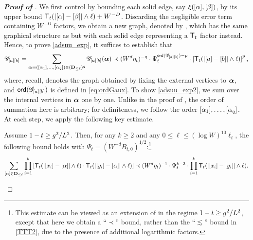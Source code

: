 \begin{proof}[\bf Proof of ]
We first control  by bounding each solid edge, say $\xi([\alpha],[\beta])$, by its upper bound ${\mathsf T}_t(|[\alpha]-[\beta]|\wedge \ell)+W^{-D}$. 
Discarding the negligible error term containing $W^{-D}$ factors, we obtain a new graph, denoted by , which has the same graphical structure as  but with each solid edge representing a ${\mathsf T}_t$ factor instead. Hence, to prove \eqref{adsuu_exp}, it suffices to establish that
\begin{equation}\label{adsuu_exp2}
\mathscr G_{[a][b]} = \sum_{{\boldsymbol{\alpha}}=([\alpha_1],\ldots,[\alpha_q])\in ({\mathbf{D}}_{\le \ell})^q}\mathscr G_{[a][b]}({\boldsymbol{\alpha}}) \prec (W^d\eta_t)^{-q}\cdot \Psi_t^{{\mathsf{ord}}(\mathscr G_{[a][b]})-p}\cdot \left[{{\mathsf T}_{t}(|[a]-[b]|\wedge \ell)}\right]^{p} ,
\end{equation}
where, recall,  denotes the graph obtained by fixing the external vertices to ${\boldsymbol{\alpha}}$, and ${\mathsf{ord}}(\mathscr G_{[a][b]})$ is defined in \eqref{eq:ordGaux}.
To show \eqref{adsuu_exp2}, we sum over the internal vertices in ${\boldsymbol{\alpha}}$ one by one. Unlike in the proof of , the order of summation here is arbitrary; for definiteness, we follow the order $[\alpha_1],\ldots,[\alpha_q]$. At each step, we apply the following key estimate.
\begin{claim}\label{claim:TTk}
Assume $1-t\ge g^2/L^{2}$. Then, for any $k \ge 2$ and any $0\le \ell \le (\log W)^{10}\ell_t$, the following bound holds with $\Psi_t=(W^{-d}B_{t,0})^{1/2}$:\footnote{This estimate can be viewed as an extension of  in the regime $1-t \ge g^2/L^2$, except that here we obtain a ``$\prec$'' bound, rather than the ``$\lesssim$'' bound in \eqref{TTT2}, due to the presence of additional logarithmic factors.}
\begin{align}\label{eq:key_T_reudce}
 \sum_{[\alpha]\in {\mathbf{D}}_{\le \ell}} \prod_{i=1}^k \left[{{\mathsf T}_{t}(|[x_i]-[\alpha]|\wedge \ell) \cdot {\mathsf T}_{t}(|[y_i]-[\alpha]|\wedge \ell) }\right] \prec (W^{d}\eta_t)^{-1} \cdot {\Psi_t^{k-2}} \cdot   \prod_{i=1}^k {\mathsf T}_{t}(|[x_i]-[y_i]|\wedge \ell) .
\end{align}
\end{claim}


\end{proof}
